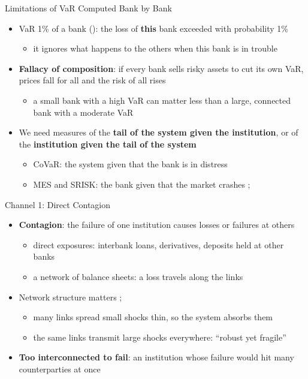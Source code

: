 \begin{frame}{Limitations of VaR Computed Bank by Bank}
\itemsize{\small}
\begin{itemize}
    \item VaR 1\% of a bank (): the loss of \textbf{this} bank exceeded with probability 1\%
    \begin{itemize}
        \item it ignores what happens to the others when this bank is in trouble
    \end{itemize}
    \item \textbf{Fallacy of composition}: if every bank sells risky assets to cut its own VaR, prices fall for all and the risk of all rises
    \begin{itemize}
        \item a small bank with a high VaR can matter less than a large, connected bank with a moderate VaR
    \end{itemize}
    \item We need measures of the \textbf{tail of the system given the institution}, or of the \textbf{institution given the tail of the system}
    \begin{itemize}
        \item CoVaR: the system given that the bank is in distress 
        \item MES and SRISK: the bank given that the market crashes ; 
    \end{itemize}
\end{itemize}
\end{frame}

\begin{frame}{Channel 1: Direct Contagion}
\itemsize{\small}
\begin{itemize}
    \item \textbf{Contagion}: the failure of one institution causes losses or failures at others
    \begin{itemize}
        \item direct exposures: interbank loans, derivatives, deposits held at other banks
        \item a network of balance sheets: a loss travels along the links 
    \end{itemize}
    \item Network structure matters ; 
    \begin{itemize}
        \item many links spread small shocks thin, so the system absorbs them
        \item the same links transmit large shocks everywhere: ``robust yet fragile''
    \end{itemize}
    \item \textbf{Too interconnected to fail}: an institution whose failure would hit many counterparties at once
\end{itemize}
\end{frame}

